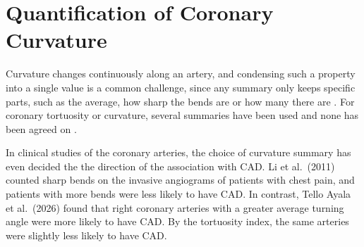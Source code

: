 \section{Quantification of Coronary Curvature}
\label{sec:lit-measure}


Curvature changes continuously along an artery, and condensing such a property into a single value
is a common challenge, since any summary only keeps specific parts, such as the average, how sharp the bends are or how many
there are \cite{ramsay2005fda}.
For coronary tortuosity or curvature, several summaries have been used and none has been agreed on
\cite{grisan2008tortuosity,kashyap2022tortuosity,li2011tortuosity,telloayala2026tortuosity}.

In clinical studies of the coronary arteries, the choice of curvature summary has even decided the the direction of the association
with CAD.
Li et al.\ (2011) \cite{li2011tortuosity} counted sharp bends on the invasive angiograms of patients
with chest pain, and patients with more bends were less likely to have CAD.
In contrast, Tello Ayala et al.\ (2026) \cite{telloayala2026tortuosity} found that right coronary
arteries with a greater average turning angle were more likely to have CAD.
By the tortuosity index, the same arteries were slightly less likely to have CAD.

